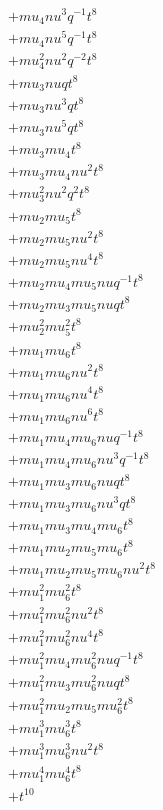 \begin{align*}
  + mu_4 nu^{3} q^{-1} t^{8} \\
  + mu_4 nu^{5} q^{-1} t^{8} \\
  + mu_4^{2} nu^{2} q^{-2} t^{8} \\
  + mu_3 nu q t^{8} \\
  + mu_3 nu^{3} q t^{8} \\
  + mu_3 nu^{5} q t^{8} \\
  + mu_3 mu_4 t^{8} \\
  + mu_3 mu_4 nu^{2} t^{8} \\
  + mu_3^{2} nu^{2} q^{2} t^{8} \\
  + mu_2 mu_5 t^{8} \\
  + mu_2 mu_5 nu^{2} t^{8} \\
  + mu_2 mu_5 nu^{4} t^{8} \\
  + mu_2 mu_4 mu_5 nu q^{-1} t^{8} \\
  + mu_2 mu_3 mu_5 nu q t^{8} \\
  + mu_2^{2} mu_5^{2} t^{8} \\
  + mu_1 mu_6 t^{8} \\
  + mu_1 mu_6 nu^{2} t^{8} \\
  + mu_1 mu_6 nu^{4} t^{8} \\
  + mu_1 mu_6 nu^{6} t^{8} \\
  + mu_1 mu_4 mu_6 nu q^{-1} t^{8} \\
  + mu_1 mu_4 mu_6 nu^{3} q^{-1} t^{8} \\
  + mu_1 mu_3 mu_6 nu q t^{8} \\
  + mu_1 mu_3 mu_6 nu^{3} q t^{8} \\
  + mu_1 mu_3 mu_4 mu_6 t^{8} \\
  + mu_1 mu_2 mu_5 mu_6 t^{8} \\
  + mu_1 mu_2 mu_5 mu_6 nu^{2} t^{8} \\
  + mu_1^{2} mu_6^{2} t^{8} \\
  + mu_1^{2} mu_6^{2} nu^{2} t^{8} \\
  + mu_1^{2} mu_6^{2} nu^{4} t^{8} \\
  + mu_1^{2} mu_4 mu_6^{2} nu q^{-1} t^{8} \\
  + mu_1^{2} mu_3 mu_6^{2} nu q t^{8} \\
  + mu_1^{2} mu_2 mu_5 mu_6^{2} t^{8} \\
  + mu_1^{3} mu_6^{3} t^{8} \\
  + mu_1^{3} mu_6^{3} nu^{2} t^{8} \\
  + mu_1^{4} mu_6^{4} t^{8} \\
  + t^{10} \\

\end{align*}
